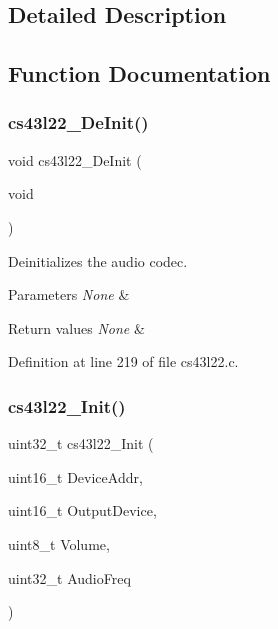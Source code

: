 \subsection{Detailed Description}


\subsection{Function Documentation}
\mbox{\label{group___c_s43_l22___exported___functions_gaeba1251bafcbeacb591dfe8cb8175447}} 
\subsubsection{\texorpdfstring{cs43l22\+\_\+\+De\+Init()}{cs43l22\_DeInit()}}
{\footnotesize\ttfamily void cs43l22\+\_\+\+De\+Init (\begin{DoxyParamCaption}\item[{void}]{ }\end{DoxyParamCaption})}



Deinitializes the audio codec. 


\begin{DoxyParams}{Parameters}
{\em None} & \\
\hline
\end{DoxyParams}

\begin{DoxyRetVals}{Return values}
{\em None} & \\
\hline
\end{DoxyRetVals}


Definition at line 219 of file cs43l22.\+c.

\mbox{\label{group___c_s43_l22___exported___functions_ga47b373a281c7ba0ea0fac752f3d0a903}} 
\subsubsection{\texorpdfstring{cs43l22\+\_\+\+Init()}{cs43l22\_Init()}}
{\footnotesize\ttfamily uint32\+\_\+t cs43l22\+\_\+\+Init (\begin{DoxyParamCaption}\item[{uint16\+\_\+t}]{Device\+Addr,  }\item[{uint16\+\_\+t}]{Output\+Device,  }\item[{uint8\+\_\+t}]{Volume,  }\item[{uint32\+\_\+t}]{Audio\+Freq }\end{DoxyParamCaption})}



